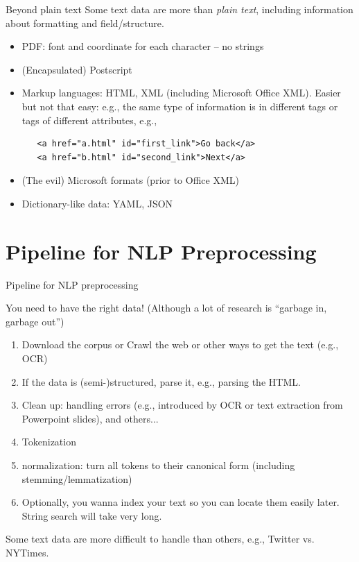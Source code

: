 \documentclass[11pt, handout]{beamer}
\begin{document}
\begin{frame}[fragile]{Beyond plain text}
Some text data are more than \emph{plain text}, including information about formatting and field/structure. 
 \begin{itemize}
  \item PDF: font and coordinate for each character -- no strings
  \item (Encapsulated) Postscript 
  \item Markup languages: HTML, XML (including Microsoft Office XML). Easier but not that easy: e.g., the same type of information is in different tags or tags of different attributes, e.g., 
  \begin{verbatim}
   <a href="a.html" id="first_link">Go back</a>
   <a href="b.html" id="second_link">Next</a> 
  \end{verbatim}
  \item (The evil) Microsoft formats (prior to Office XML)
  \item Dictionary-like data: YAML, JSON
 \end{itemize}
\end{frame}

 
\section{Pipeline for NLP Preprocessing}
\begin{frame}{Pipeline for NLP preprocessing}

You need to have the right data! (Although a lot of research is ``garbage in, garbage out'')

\begin{enumerate}[<+->]
 \item Download the corpus or Crawl the web or other ways to get the text (e.g., OCR) 
 \item If the data is (semi-)structured, parse it, e.g., parsing the HTML. 
 \item Clean up: handling errors (e.g., introduced by OCR or text extraction from Powerpoint slides), and others...
 \item Tokenization 
 \item normalization: turn all tokens to their canonical form (including stemming/lemmatization)
 \item Optionally, you wanna index your text so you can locate them easily later. String search will take very long. 
\end{enumerate}
Some text data are more difficult to handle than others, e.g., Twitter vs. NYTimes. 
\end{frame}
 
\end{document}
